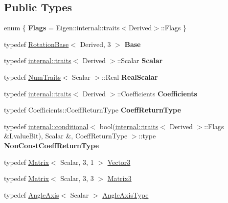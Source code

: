 \subsection*{Public Types}
\begin{DoxyCompactItemize}
\item 
\mbox{\label{class_eigen_1_1_quaternion_base_add77d8734f36fe4fe78f07b52014c34d}} 
enum \{ {\bfseries Flags} = Eigen\+::internal\+::traits$<$Derived$>$\+::Flags
 \}
\item 
\mbox{\label{class_eigen_1_1_quaternion_base_ad144f253fc2dcc7d549c83e0661d8562}} 
typedef \mbox{\hyperlink{class_eigen_1_1_rotation_base}{Rotation\+Base}}$<$ Derived, 3 $>$ {\bfseries Base}
\item 
\mbox{\label{class_eigen_1_1_quaternion_base_aed1c5f5da84a95603f9b17028055de52}} 
typedef \mbox{\hyperlink{struct_eigen_1_1internal_1_1traits}{internal\+::traits}}$<$ Derived $>$\+::Scalar {\bfseries Scalar}
\item 
\mbox{\label{class_eigen_1_1_quaternion_base_ae296e574fd1dd5cb11ab901dacf035cf}} 
typedef \mbox{\hyperlink{struct_eigen_1_1_num_traits}{Num\+Traits}}$<$ Scalar $>$\+::Real {\bfseries Real\+Scalar}
\item 
\mbox{\label{class_eigen_1_1_quaternion_base_ac69d7d4d9a07f3d45cd73276f66656ac}} 
typedef \mbox{\hyperlink{struct_eigen_1_1internal_1_1traits}{internal\+::traits}}$<$ Derived $>$\+::Coefficients {\bfseries Coefficients}
\item 
\mbox{\label{class_eigen_1_1_quaternion_base_ad5ba7b271ce2a5f7318c4e2f7a2c4ad4}} 
typedef Coefficients\+::\+Coeff\+Return\+Type {\bfseries Coeff\+Return\+Type}
\item 
\mbox{\label{class_eigen_1_1_quaternion_base_a5f238a1a89d886dd009c0369b37afe9e}} 
typedef \mbox{\hyperlink{struct_eigen_1_1internal_1_1conditional}{internal\+::conditional}}$<$ bool(\mbox{\hyperlink{struct_eigen_1_1internal_1_1traits}{internal\+::traits}}$<$ Derived $>$\+::Flags \&Lvalue\+Bit), Scalar \&, Coeff\+Return\+Type $>$\+::type {\bfseries Non\+Const\+Coeff\+Return\+Type}
\item 
typedef \mbox{\hyperlink{class_eigen_1_1_matrix}{Matrix}}$<$ Scalar, 3, 1 $>$ \mbox{\hyperlink{class_eigen_1_1_quaternion_base_a974c0529d55983b0b3a6d99a8466f331}{Vector3}}
\item 
typedef \mbox{\hyperlink{class_eigen_1_1_matrix}{Matrix}}$<$ Scalar, 3, 3 $>$ \mbox{\hyperlink{class_eigen_1_1_quaternion_base_ac3972e6cb0f56cccbe9e3946a7e494f8}{Matrix3}}
\item 
typedef \mbox{\hyperlink{class_eigen_1_1_angle_axis}{Angle\+Axis}}$<$ Scalar $>$ \mbox{\hyperlink{class_eigen_1_1_quaternion_base_aed266c63b10a4028304901d9c8614199}{Angle\+Axis\+Type}}
\end{DoxyCompactItemize}
